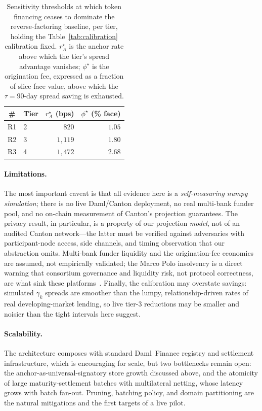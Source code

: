 \documentclass[10pt,twocolumn,letterpaper]{article}
\begin{document}
\begin{table}[h]
\centering
\caption{Sensitivity thresholds at which token financing ceases to dominate the
reverse-factoring baseline, per tier, holding the Table~\ref{tab:calibration}
calibration fixed. $r_A^{\star}$ is the anchor rate above which the tier's spread
advantage vanishes; $\phi^{\star}$ is the origination fee, expressed as a fraction of
slice face value, above which the $\tau=90$-day spread saving is exhausted.}
\label{tab:sensitivity}
\small
\begin{tabular}{@{}clrr@{}}
\toprule
\textbf{\#} & \textbf{Tier} & \textbf{$r_A^{\star}$ (bps)} & \textbf{$\phi^{\star}$ (\% face)} \\
\midrule
R1 & 2 & $820$    & $1.05$ \\
R2 & 3 & $1{,}119$ & $1.80$ \\
R3 & 4 & $1{,}472$ & $2.68$ \\
\bottomrule
\end{tabular}
\end{table}

\paragraph{Limitations.} The most important caveat is that all evidence here is a
\emph{self-measuring numpy simulation}; there is no live Daml/Canton deployment, no
real multi-bank funder pool, and no on-chain measurement of Canton's projection
guarantees. The privacy result, in particular, is a property of our projection
\emph{model}, not of an audited Canton network---the latter must be verified against
adversaries with participant-node access, side channels, and timing observation that
our abstraction omits. Multi-bank funder liquidity and the origination-fee economics
are assumed, not empirically validated; the Marco Polo insolvency is a direct warning
that consortium governance and liquidity risk, not protocol correctness, are what
sink these platforms~\cite{marcopolo2022}. Finally, the calibration may overstate
savings: simulated $\gamma_k$ spreads are smoother than the lumpy, relationship-driven
rates of real developing-market lending, so live tier-3 reductions may be smaller and
noisier than the tight intervals here suggest.

\paragraph{Scalability.} The architecture composes with standard Daml~Finance
registry and settlement infrastructure, which is encouraging for scale, but two
bottlenecks remain open: the anchor-as-universal-signatory store growth discussed
above, and the atomicity of large maturity-settlement batches with multilateral
netting, whose latency grows with batch fan-out. Pruning, batching policy, and domain
partitioning are the natural mitigations and the first targets of a live pilot.
\end{document}
